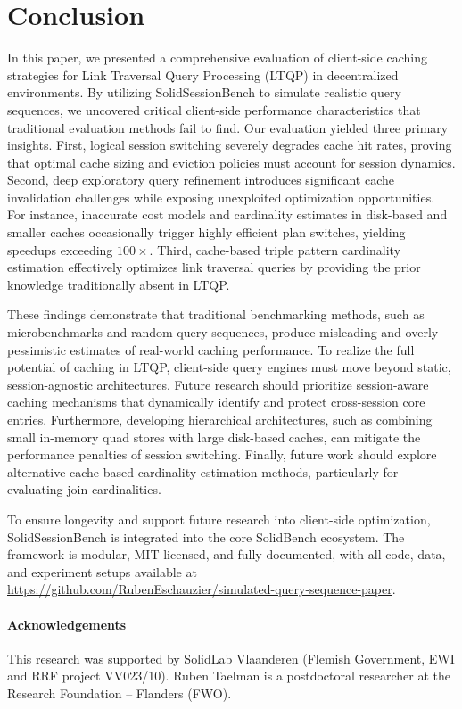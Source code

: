 \section{Conclusion}
\label{sec:conclusion}

In this paper, we presented a comprehensive evaluation of client-side caching strategies 
for Link Traversal Query Processing (LTQP) in decentralized environments. 
By utilizing SolidSessionBench to simulate realistic query sequences, 
we uncovered critical client-side performance characteristics that traditional evaluation methods fail to find. 
Our evaluation yielded three primary insights. 
First, logical session switching severely degrades cache hit rates,
proving that optimal cache sizing and eviction policies must account for session dynamics. 
Second, deep exploratory query refinement introduces significant cache invalidation challenges
while exposing unexploited optimization opportunities.
For instance, inaccurate cost models and cardinality estimates in disk-based and smaller caches 
occasionally trigger highly efficient plan switches, yielding speedups exceeding $100\times$.
Third, cache-based triple pattern cardinality estimation effectively optimizes link traversal queries 
by providing the prior knowledge traditionally absent in LTQP.

These findings demonstrate that traditional benchmarking methods, such as microbenchmarks and random query sequences,
produce misleading and overly pessimistic estimates of real-world caching performance. 
To realize the full potential of caching in LTQP, client-side query engines must move beyond static, 
session-agnostic architectures. 
Future research should prioritize session-aware caching mechanisms 
that dynamically identify and protect cross-session core entries. 
Furthermore, developing hierarchical architectures, such as combining small in-memory quad stores with large disk-based caches,
can mitigate the performance penalties of session switching. 
Finally, future work should explore alternative cache-based cardinality estimation methods, 
particularly for evaluating join cardinalities.

To ensure longevity and support future research into client-side optimization, 
SolidSessionBench is integrated into the core SolidBench ecosystem. 
The framework is modular, MIT-licensed, and fully documented, with all code, data, 
and experiment setups available at \url{https://github.com/RubenEschauzier/simulated-query-sequence-paper}.

\paragraph{Acknowledgements} This research was supported by SolidLab Vlaanderen (Flemish Government, EWI and RRF project VV023/10).
Ruben Taelman is a postdoctoral researcher at the Research Foundation – Flanders (FWO).

